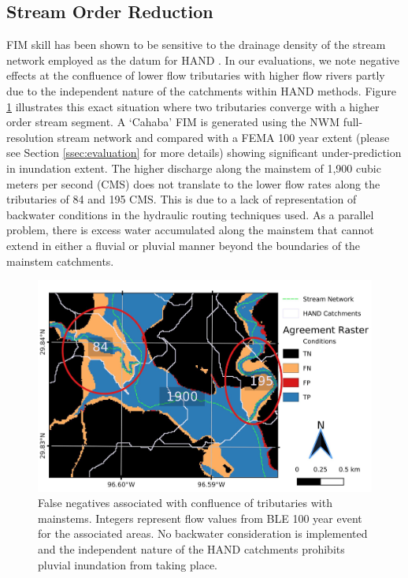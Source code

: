 \subsection{Stream Order Reduction}
\label{ssec:stream_order_reduction}
%
FIM skill has been shown to be sensitive to the drainage density of the stream network employed as the datum for HAND \cite{zhang2018comparative,mcgehee2016modified,li2020evaluation,nobre2016hand}.
In our evaluations, we note negative effects at the confluence of lower flow tributaries with higher flow rivers partly due to the independent nature of the catchments within HAND methods.
Figure \ref{fig:catchment_boundaries_issue} illustrates this exact situation where two tributaries converge with a higher order stream segment. 
A `Cahaba' FIM is generated using the NWM full-resolution stream network and compared with a FEMA 100 year extent (please see Section \ref{ssec:evaluation} for more details) showing significant under-prediction in inundation extent.
The higher discharge along the mainstem of 1,900 cubic meters per second (CMS) does not translate to the lower flow rates along the tributaries of 84 and 195 CMS. 
This is due to a lack of representation of backwater conditions in the hydraulic routing techniques used.
As a parallel problem, there is excess water accumulated along the mainstem that cannot extend in either a fluvial or pluvial manner beyond the boundaries of the mainstem catchments.
%
\begin{figure}[h!]
\centering
\includegraphics[scale=1.0]{figures/catchment_boundaries_issue.jpg}
\caption{False negatives associated with confluence of tributaries with mainstems. Integers represent flow values from BLE 100 year event for the associated areas. 
No backwater consideration is implemented and the independent nature of the HAND catchments prohibits pluvial inundation from taking place.}
\label{fig:catchment_boundaries_issue}
\end{figure}
